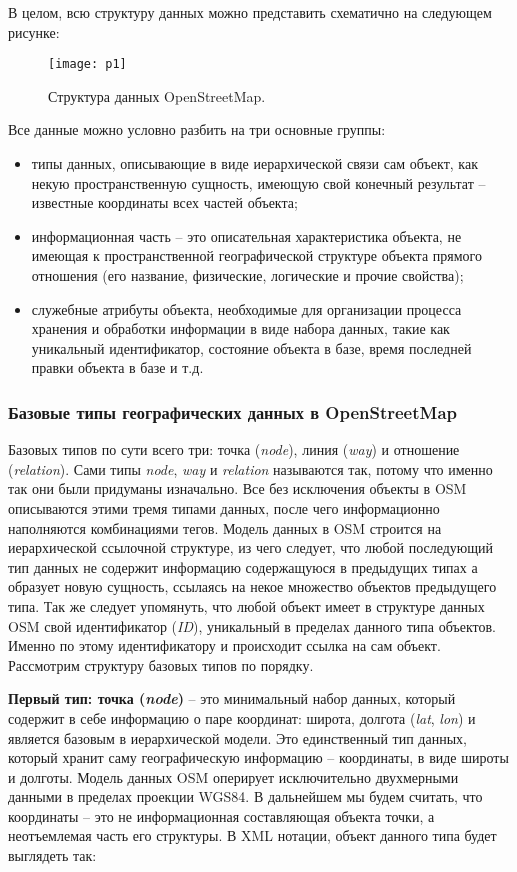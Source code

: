 В целом, всю структуру данных можно представить схематично на следующем рисунке:
\begin{figure}[ht!]
    \center
    \texttt{[image: p1]}
    \caption{Структура данных OpenStreetMap.}
\end{figure}

Все данные можно условно разбить на три основные группы:
\begin{itemize}
    \item типы данных, описывающие в виде иерархической связи сам объект, как 
        некую пространственную сущность, имеющую свой конечный результат -- 
        известные координаты всех частей объекта;
    \item информационная часть -- это описательная характеристика объекта, не 
        имеющая к пространственной географической структуре объекта прямого 
        отношения (его название, физические, логические и прочие свойства);
    \item служебные атрибуты объекта, необходимые для организации процесса 
        хранения и обработки информации в виде набора данных, такие как 
        уникальный идентификатор, состояние объекта в базе, время последней 
        правки объекта в базе и т.д.
\end{itemize}

\subsubsection{Базовые типы географических данных в OpenStreetMap}
\label{part01}
Базовых типов по сути всего три: точка (\emph{node}), линия (\emph{way}) и 
отношение (\emph{relation}). Сами типы \emph{node}, \emph{way} и 
\emph{relation} называются так, потому что именно так они были придуманы 
изначально. Все без исключения объекты в OSM описываются этими тремя типами 
данных, после чего информационно наполняются комбинациями тегов. Модель данных 
в OSM строится на иерархической ссылочной структуре, из чего следует, что 
любой последующий тип данных не содержит информацию содержащуюся в предыдущих 
типах а образует новую сущность, ссылаясь на некое множество объектов 
предыдущего типа. Так же следует упомянуть, что любой объект имеет в структуре 
данных OSM свой идентификатор (\emph{ID}), уникальный в пределах данного типа 
объектов. Именно по этому идентификатору и происходит ссылка на сам объект. 
Рассмотрим структуру базовых типов по порядку.

\textbf{Первый тип: точка (\emph{node})} -- это минимальный набор данных, 
который содержит в себе информацию о паре координат: широта, долгота 
(\emph{lat}, \emph{lon}) и является базовым в иерархической модели. Это 
единственный тип данных, который хранит саму географическую информацию -- 
координаты, в виде широты и долготы. Модель данных OSM оперирует исключительно 
двухмерными данными в пределах проекции WGS84. В дальнейшем мы будем считать, 
что координаты -- это не информационная составляющая объекта точки, а 
неотъемлемая часть его структуры. В XML нотации, объект данного типа будет 
выглядеть так:

